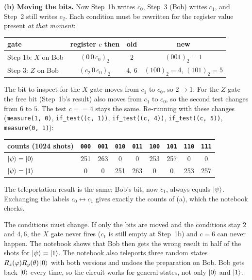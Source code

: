 \documentclass[a4paper, 10pt]{article}
\begin{document}
\begin{solution}
	\noindent \textbf{(b) Moving the bits.} Now Step~1b writes \( c_0 \), Step~3 (Bob) writes \( c_1 \), and Step~2 still writes \( c_2 \). Each condition must be rewritten for the register value present \emph{at that moment}:
	\begin{center}
		\begin{tabular}{lccc}
			\toprule
			gate                    & register \( c \) then & old              & new                                  \\
			\midrule
			Step 1b: \( X \) on Bob & \( (0\,0\,c_0)_2 \)   & \( 2 \)          & \( (001)_2 = 1 \)                    \\
			Step 3: \( Z \) on Bob  & \( (c_2\,0\,c_0)_2 \) & \( 4 \), \( 6 \) & \( (100)_2 = 4 \), \( (101)_2 = 5 \) \\
			\bottomrule
		\end{tabular}
	\end{center}
	The bit to inspect for the \( X \) gate moves from \( c_1 \) to \( c_0 \), so \( 2 \to 1 \). For the \( Z \) gate the free bit (Step~1b's result) also moves from \( c_1 \) to \( c_0 \), so the second test changes from \( 6 \) to \( 5 \). The test \( c == 4 \) stays the same.
	Re-running with these changes (\texttt{measure(1, 0)}, \texttt{if\_test((c, 1))}, \texttt{if\_test((c, 4))}, \texttt{if\_test((c, 5))}, \texttt{measure(0, 1)}):
	\begin{center}
		\begin{tabular}{lcccccccc}
			\toprule
			counts (1024 shots)        & \texttt{000} & \texttt{001} & \texttt{010} & \texttt{011} & \texttt{100} & \texttt{101} & \texttt{110} & \texttt{111} \\
			\midrule
			\( \ket{\psi} = \ket{0} \) & 251          & 263          & 0            & 0            & 253          & 257          & 0            & 0            \\
			\( \ket{\psi} = \ket{1} \) & 0            & 0            & 251          & 263          & 0            & 0            & 253          & 257          \\
			\bottomrule
		\end{tabular}
	\end{center}
	\noindent The teleportation result is the same: Bob's bit, now \( c_1 \), always equals \( \ket{\psi} \). Exchanging the labels \( c_0 \leftrightarrow c_1 \) gives exactly the counts of (a), which the notebook checks.

	\begin{remark}
		The conditions must change. If only the bits are moved and the conditions stay \( 2 \) and \( 4, 6 \), the \( X \) gate never fires (\( c_1 \) is still empty at Step~1b) and \( c = 6 \) can never happen.
		The notebook shows that Bob then gets the wrong result in half of the shots for \( \ket{\psi} = \ket{1} \).
		The notebook also teleports three random states \( R_z(\varphi)R_y(\theta)\ket{0} \) with both versions and undoes the preparation on Bob. Bob gets back \( \ket{0} \) every time, so the circuit works for general states, not only \( \ket{0} \) and \( \ket{1} \).
	\end{remark}
\end{solution}
\end{document}
